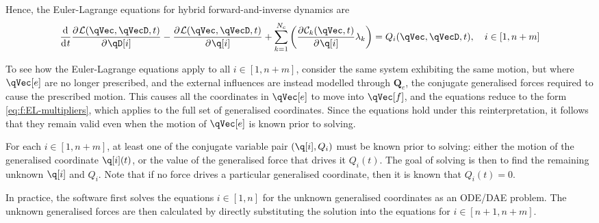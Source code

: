 \documentclass[11pt]{article}
\newcommand{\oD}[2]{
    \frac{\mathrm{d}\mspace{1mu}#1}{\mathrm{d}\mspace{1mu}#2}
}
\newcommand{\pD}[2]{
    \frac{\partial\mspace{1mu}#1}{\partial\mspace{1mu}#2}
}
\begin{document}
Hence, the Euler-Lagrange equations for hybrid forward-and-inverse dynamics are
\begin{equation} \label{eq:f:EL-hybrid}
    \oD{}{t}\pD{\mathcal{L}(\qVec, \qVecD, t)}{\qD[i]} 
    - \pD{\mathcal{L}(\qVec, \qVecD, t)}{\q[i]}
    + \sum_{k=1}^{N_c} \del{\pD{\mathcal{C}_k(\qVec, t)}{\q[i]} \lambda_k}
    = Q_i(\qVec, \qVecD, t)
    ,\quad i\in[1,n+m]
\end{equation}

To see how the Euler-Lagrange equations apply to all $i\in[1,n+m]$, consider the same system exhibiting the same motion, but where $\qVec[e]$ are no longer prescribed, and the external influences are instead modelled through $\mathbf{Q}_e$, the conjugate generalised forces required to cause the prescribed motion. This causes all the coordinates in $\qVec[e]$ to move into $\qVec[f]$, and the equations reduce to the form \eqref{eq:f:EL-multipliers}, which applies to the full set of generalised coordinates. Since the equations hold under this reinterpretation, it follows that they remain valid even when the motion of $\qVec[e]$ is known prior to solving.

For each $i\in[1,n+m]$, at least one of the conjugate variable pair $(\q[i], Q_i)$ must be known prior to solving: either the motion of the generalised coordinate $\q[i](t)$, or the value of the generalised force that drives it $Q_i(t)$. The goal of solving is then to find the remaining unknown $\q[i]$ and $Q_i$. Note that if no force drives a particular generalised coordinate, then it is known that $Q_i(t)=0$.

In practice, the software first solves the equations $i\in[1,n]$ for the unknown generalised coordinates as an ODE/DAE problem. The unknown generalised forces are then calculated by directly substituting the solution into the equations for $i\in[n+1,n+m]$.



\end{document}

